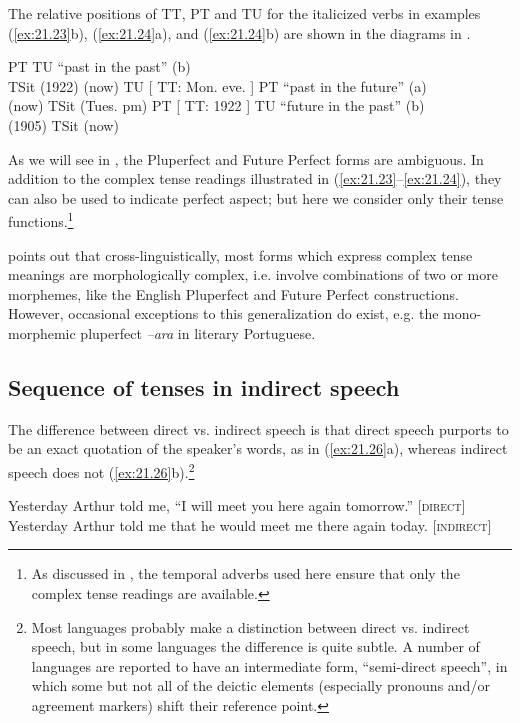 The relative positions of TT, PT and TU for the italicized verbs in examples (\ref{ex:21.23}b), (\ref{ex:21.24}a), and (\ref{ex:21.24}b) are shown in the diagrams in .


\ea \label{ex:21.25}
\ea       [  TT: 1905  ]  PT  TU   “past in the past” (b)\\
         \textbf{{\textbar}}TSit\textbf{{\textbar}}    (1922)  (now)
\ex    TU  [  TT: Mon. eve.  ]  PT  “past in the future” (a)\\
  (now)      \textbf{{\textbar}}TSit\textbf{{\textbar}}    (Tues. pm)
\ex    PT  [  TT: 1922  ]  TU  “future in the past” (b)\\
  (1905)      \textbf{{\textbar}}TSit\textbf{{\textbar}}   (now)
\z \z


As we will see in , the Pluperfect and Future Perfect forms are ambiguous. In addition to the complex tense readings illustrated in (\ref{ex:21.23}--\ref{ex:21.24}), they can also be used to indicate perfect aspect; but here we consider only their tense functions.\footnote{As discussed in , the temporal adverbs used here ensure that only the complex tense readings are available.}



\citet{Comrie1985} points out that cross-linguistically, most forms which express complex tense meanings are morphologically complex, i.e. involve combinations of two or more morphemes, like the English Pluperfect and Future Perfect constructions. However, occasional exceptions to this generalization do exist, e.g. the mono-morphemic pluperfect \textit{–ara} in literary Portuguese.


\subsection{Sequence of tenses in indirect speech}\label{sec:21.4.2}

The difference between direct vs. indirect speech is that direct speech purports to be an exact quotation of the speaker’s words, as in (\ref{ex:21.26}a), whereas indirect speech does not (\ref{ex:21.26}b).\footnote{Most languages probably make a distinction between direct vs. indirect speech, but in some languages the difference is quite subtle. A number of languages are reported to have an intermediate form, “semi-direct speech”, in which some but not all of the deictic elements (especially pronouns and/or agreement markers) shift their reference point.}


\ea \label{ex:21.26}
\ea  Yesterday Arthur told me, “I will meet you here again tomorrow.”  [\textsc{direct}]\\
\ex Yesterday Arthur told me that he would meet me there again today.  [\textsc{indirect}]
                       \z
\z


